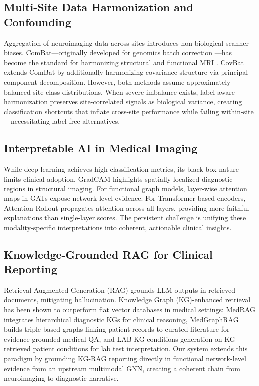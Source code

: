 \documentclass[conference]{IEEEtran}
\begin{document}
\subsection{Multi-Site Data Harmonization and Confounding}
Aggregation of neuroimaging data across sites introduces non-biological scanner biases. ComBat---originally developed for genomics batch correction \cite{johnson2007combat}---has become the standard for harmonizing structural and functional MRI \cite{fortin2018harmonization}. CovBat \cite{chen2022covbat} extends ComBat by additionally harmonizing covariance structure via principal component decomposition. However, both methods assume approximately balanced site-class distributions. When severe imbalance exists, label-aware harmonization preserves site-correlated signals as biological variance, creating classification shortcuts that inflate cross-site performance while failing within-site---necessitating label-free alternatives.

\subsection{Interpretable AI in Medical Imaging}
While deep learning achieves high classification metrics, its black-box nature limits clinical adoption. GradCAM \cite{selvaraju2017grad} highlights spatially localized diagnostic regions in structural imaging. For functional graph models, layer-wise attention maps in GATs expose network-level evidence. For Transformer-based encoders, Attention Rollout \cite{abnar2020rollout} propagates attention across all layers, providing more faithful explanations than single-layer scores. The persistent challenge is unifying these modality-specific interpretations into coherent, actionable clinical insights.

\subsection{Knowledge-Grounded RAG for Clinical Reporting}
Retrieval-Augmented Generation (RAG) \cite{lewis2020rag} grounds LLM outputs in retrieved documents, mitigating hallucination. Knowledge Graph (KG)-enhanced retrieval has been shown to outperform flat vector databases in medical settings: MedRAG \cite{xiong2025medrag} integrates hierarchical diagnostic KGs for clinical reasoning, MedGraphRAG \cite{wu2025medgraphrag} builds triple-based graphs linking patient records to curated literature for evidence-grounded medical QA, and LAB-KG \cite{labkg2025} conditions generation on KG-retrieved patient conditions for lab test interpretation. Our system extends this paradigm by grounding KG-RAG reporting directly in functional network-level evidence from an upstream multimodal GNN, creating a coherent chain from neuroimaging to diagnostic narrative.
\end{document}
